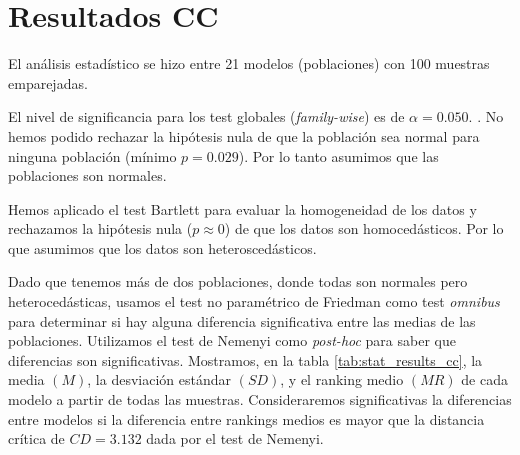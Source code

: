 \documentclass[a4paper,oneside,11pt,leqno]{article}
\begin{document}
	\section{Resultados CC}
	\label{sec:results_cc}

	El análisis estadístico se hizo entre 21 modelos (poblaciones) con 100 muestras emparejadas.

	El nivel de significancia para los test globales (\textit{family-wise}) es de $\alpha=0.050$.
.
	No hemos podido rechazar la hipótesis nula de que la población sea normal para ninguna población (mínimo $p=0.029$). Por lo tanto asumimos que las poblaciones son normales.

	Hemos aplicado el test Bartlett para evaluar la homogeneidad de los datos y rechazamos la hipótesis nula ($p\approx 0$) de que los datos son homocedásticos. Por lo que asumimos que los datos son heteroscedásticos.

	Dado que tenemos más de dos poblaciones, donde todas son normales pero heterocedásticas, usamos el test no paramétrico de Friedman como test \textit{omnibus} para determinar si hay alguna diferencia significativa entre las medias de las poblaciones. Utilizamos el test de Nemenyi como \textit{post-hoc} para saber que diferencias son significativas. Mostramos, en la tabla \ref{tab:stat_results_cc}, la media $(M)$, la desviación estándar $(SD)$, y el ranking medio $(MR)$ de cada modelo a partir de todas las muestras. Consideraremos significativas la diferencias entre modelos si la diferencia entre rankings medios es mayor que la distancia crítica de $CD=3.132$ dada por el test de Nemenyi.
\end{document}

